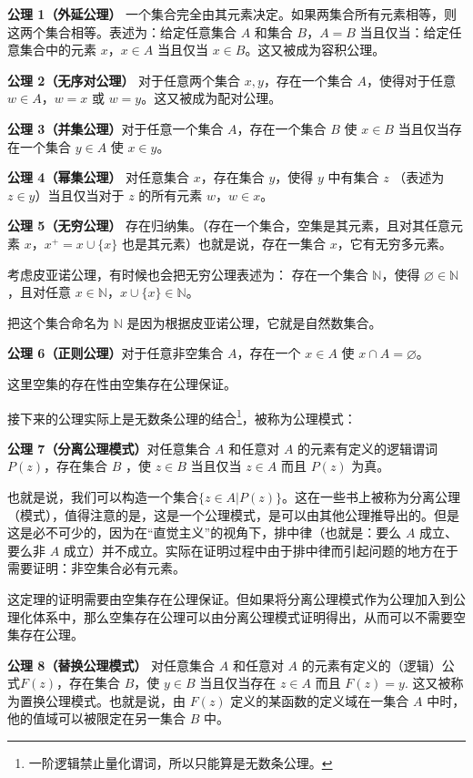 \textbf{公理 1（外延公理）} 一个集合完全由其元素决定。如果两集合所有元素相等，则这两个集合相等。表述为：给定任意集合 $A$ 和集合 $B$，$A=B$ 当且仅当：给定任意集合中的元素 $x$，$x \in A$ 当且仅当 $x \in B$。这又被成为容积公理。

\textbf{公理 2（无序对公理）} 对于任意两个集合 $x,y$，存在一个集合 $A$，使得对于任意 $w\in A$，$w=x$ 或 $w=y$。这又被成为配对公理。

\textbf{公理 3（并集公理）}对于任意一个集合 $A$，存在一个集合 $B$ 使 $x\in B$ 当且仅当存在一个集合 $y\in A$ 使 $x\in y$。

\textbf{公理 4（幂集公理）} 对任意集合 $x$，存在集合 $y$，使得 $y$ 中有集合 $z$ （表述为 $z \in y$）当且仅当对于 $z$ 的所有元素 $w$，$w\in x$。

\textbf{公理 5（无穷公理）} 存在归纳集。（存在一个集合，空集是其元素，且对其任意元素 $x$，$x^+ = x\cup \{x\}$ 也是其元素）也就是说，存在一集合 $x$，它有无穷多元素。

考虑皮亚诺公理，有时候也会把无穷公理表述为：
存在一个集合 $\mathbb{N}$，使得 $\varnothing\in\mathbb{N}$，且对任意 $x\in \mathbb{N}$，$x\cup\{x\}\in\mathbb{N}$。

把这个集合命名为 $\mathbb{N}$ 是因为根据皮亚诺公理，它就是自然数集合。

\textbf{公理 6（正则公理）}对于任意非空集合 $A$，存在一个 $x\in A$ 使 $x\cap A=\varnothing$。

这里空集的存在性由空集存在公理保证。

接下来的公理实际上是无数条公理的结合\footnote{一阶逻辑禁止量化谓词，所以只能算是无数条公理。}，被称为公理模式：

\textbf{公理 7（分离公理模式）}对任意集合 $A$ 和任意对 $A$ 的元素有定义的逻辑谓词 $P(z)$，存在集合 $B$ ，使 $z\in B$ 当且仅当 $z\in A$ 而且 $P(z)$ 为真。

也就是说，我们可以构造一个集合$\{z\in A | P(z)\}$。这在一些书上被称为分离公理（模式），值得注意的是，这是一个公理模式，是可以由其他公理推导出的。但是这是必不可少的，因为在“直觉主义”的视角下，排中律（也就是：要么 $A$ 成立、要么非 $A$ 成立）并不成立。实际在证明过程中由于排中律而引起问题的地方在于需要证明：非空集合必有元素。

这定理的证明需要由空集存在公理保证。但如果将分离公理模式作为公理加入到公理化体系中，那么空集存在公理可以由分离公理模式证明得出，从而可以不需要空集存在公理。

\textbf{公理 8（替换公理模式）} 对任意集合 $A$ 和任意对 $A$ 的元素有定义的（逻辑）公式$F(z)$，存在集合 $B$，使 $y\in B$ 当且仅当存在 $z\in A$ 而且 $F(z)=y$. 这又被称为置换公理模式。也就是说，由 $F(z)$ 定义的某函数的定义域在一集合 $A$ 中时，他的值域可以被限定在另一集合 $B$ 中。

